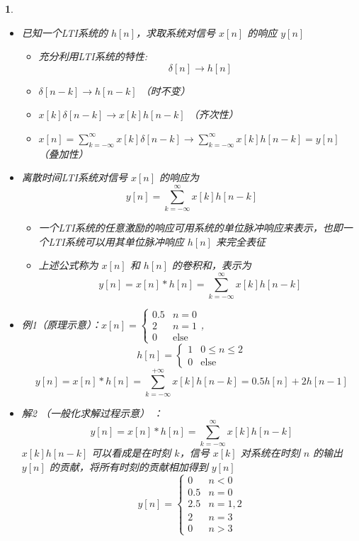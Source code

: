 \documentclass[UTF8]{report}
\theoremstyle{MyLineTheoremStyle} %
\theoremstyle{MyBlockTheoremStyle} %
\theoremstyle{MySubsubsectionStyle} %
\newtheorem{definition}{}
\begin{document}
\begin{definition}
\begin{itemize}
        \item 已知一个LTI系统的 $h[n]$，求取系统对信号 $x[n]$ 的响应 $y[n]$
        \begin{itemize}
            \item 充分利用LTI系统的特性:
            \[
            \delta[n] \rightarrow h[n]
            \]
            \item $\delta[n - k] \rightarrow h[n - k]$ （时不变）
            \item $x[k] \delta[n - k] \rightarrow x[k] h[n - k]$ （齐次性）
            \item $x[n] = \sum_{k=-\infty}^{\infty} x[k] \delta[n - k] \rightarrow \sum_{k=-\infty}^{\infty} x[k] h[n - k] = y[n]$ （叠加性）
        \end{itemize}

        \item 离散时间LTI系统对信号 $x[n]$ 的响应为
        \[
        y[n] = \sum_{k=-\infty}^{\infty} x[k] h[n - k]
        \]
        \begin{itemize}
            \item 一个LTI系统的任意激励的响应可用系统的单位脉冲响应来表示，也即一个LTI系统可以用其单位脉冲响应 $h[n]$ 来完全表征
            \item 上述公式称为 $x[n]$ 和 $h[n]$ 的卷积和，表示为
            \[
            y[n] = x[n] * h[n] = \sum_{k=-\infty}^{\infty} x[k] h[n - k]
            \]
        \end{itemize}

        \item 例1（原理示意）：$x[n] = \begin{cases} 
        0.5 & n = 0 \\
        2 & n = 1 \\
        0 & \text{else} 
        \end{cases}$,
        \[
        h[n] = \begin{cases} 
        1 & 0 \leq n \leq 2 \\
        0 & \text{else} 
        \end{cases}
        \]
        \[
        y[n] = x[n] * h[n] = \sum_{k=-\infty}^{+\infty} x[k] h[n - k] = 0.5h[n] + 2h[n - 1]
        \]

        \item 解2 （一般化求解过程示意） ：
        \[
        y[n] = x[n] * h[n] = \sum_{k=-\infty}^{\infty} x[k] h[n - k]
        \]
        $x[k] h[n - k]$ 可以看成是在时刻 $k$，信号 $x[k]$ 对系统在时刻 $n$ 的输出 $y[n]$ 的贡献，将所有时刻的贡献相加得到 $y[n]$
        \[
        y[n] = \begin{cases} 
        0 & n < 0 \\
        0.5 & n = 0 \\
        2.5 & n = 1, 2 \\
        2 & n = 3 \\
        0 & n > 3 
        \end{cases}
        \]


\end{itemize}
\end{definition}
\end{document}
